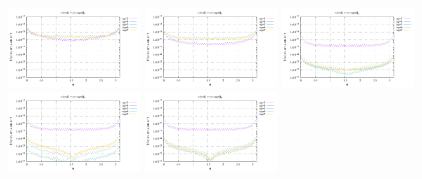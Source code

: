 \noindent
\includegraphics[width=3.5cm]{python_codes/fieldstone_152/RESULTS/exp1/sr2_16_m2}
\includegraphics[width=3.5cm]{python_codes/fieldstone_152/RESULTS/exp1/sr2_16_m3}
\includegraphics[width=3.5cm]{python_codes/fieldstone_152/RESULTS/exp1/sr2_16_m4}
\includegraphics[width=3.5cm]{python_codes/fieldstone_152/RESULTS/exp1/sr2_16_m5}
\includegraphics[width=3.5cm]{python_codes/fieldstone_152/RESULTS/exp1/sr2_16_m6}

